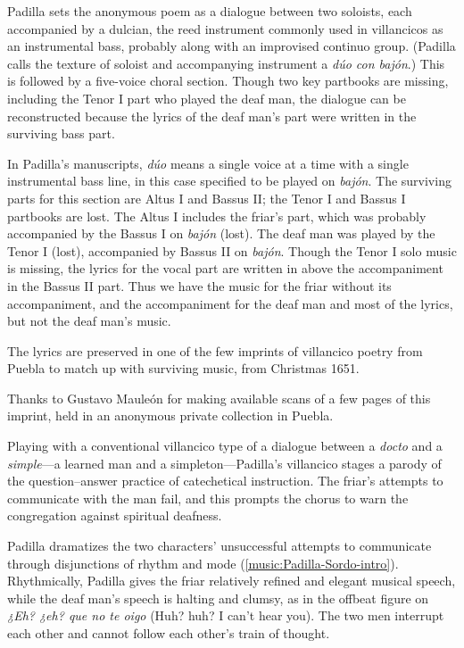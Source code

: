 Padilla sets the anonymous poem as a dialogue between two soloists, each
accompanied by a dulcian, the reed instrument commonly used in villancicos as an
instrumental bass, probably along with an improvised continuo group.
(Padilla calls the texture of soloist and accompanying instrument a \emph{dúo con
bajón}.)
This is followed by a five-voice choral section.
Though two key partbooks are missing, including the Tenor I part who played the
deaf man, the dialogue can be reconstructed because the lyrics of the deaf man's
part were written in the surviving bass part.%
\begin{Footnote}
    In Padilla's manuscripts, \emph{dúo} means a single voice at a time with a
    single instrumental bass line, in this case specified to be played on
    \emph{bajón}.  
    The surviving parts for this section are Altus I and Bassus II; the Tenor I
    and Bassus I partbooks are lost.
    The Altus I includes the friar's part, which was probably accompanied by the
    Bassus I on \emph{bajón} (lost).  
    The deaf man was played by the Tenor I (lost), accompanied by Bassus II on
    \emph{bajón}.
    Though the Tenor I solo music is missing, the lyrics for the vocal part are
    written in above the accompaniment in the Bassus II part.  
    Thus we have the music for the friar without its accompaniment, and the
    accompaniment for the deaf man and most of the lyrics, but not the deaf
    man's music.
\end{Footnote}
The lyrics are preserved in one of the few imprints of villancico poetry from
Puebla to match up with surviving music, from Christmas 1651.%
\begin{Footnote}
    Thanks to Gustavo Mauleón for making available scans of a few pages of this
    imprint, held in an anonymous private collection in Puebla.
\end{Footnote}

Playing with a conventional villancico type of a dialogue between a \emph{docto}
and a \emph{simple}---a learned man and a simpleton---Padilla's villancico
stages a parody of the question--answer practice of catechetical instruction.
The friar's attempts to communicate with the  man fail, and this
prompts the chorus to warn the congregation against spiritual deafness.

Padilla dramatizes the two characters' unsuccessful attempts to communicate
through disjunctions of rhythm and mode  (\cref{music:Padilla-Sordo-intro}).
Rhythmically, Padilla gives the friar relatively refined and elegant musical
speech, while the deaf man's speech is halting and clumsy, as in the offbeat
figure on \emph{¿Eh? ¿eh? que no te oigo} (Huh? huh? I can't hear you).
The two men interrupt each other and cannot follow each other's train of
thought.

